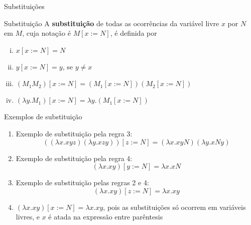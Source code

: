 \begin{frame}[fragile]{Substituições}

    \begin{block}{Substituição}
    A \textbf{substituição} de todas as ocorrências da variável livre $x$ por $N$ em $M$, cuja
    notação é $M[x:=N]$, é definida por
    \begin{enumerate}[i.]
        \item $x[x:=N] = N$
        \item $y[x:=N] = y$, se $y\neq x$
        \item $(M_1M_2)[x:=N] = (M_1[x:=N])(M_2[x:=N])$
        \item $(\lambda y.M_1)[x:=N] = \lambda y.(M_1[x:=N])$
    \end{enumerate}
    \end{block}

\end{frame}

\begin{frame}[fragile]{Exemplos de substituição}

    \begin{enumerate}
        \item Exemplo de substituição pela regra 3:
        \[
            ((\lambda x.xyz)(\lambda y.xzy))[z:=N] = (\lambda x.xyN)(\lambda y.xNy) 
        \]

        \item Exemplo de substituição pela regra 4:
        \[
            (\lambda x.xy)[y:=N] = \lambda x.xN
        \]

        \item Exemplo de substituição pelas regras 2 e 4:
        \[
            (\lambda x.xy)[z:=N] = \lambda x.xy
        \]

        \item $(\lambda x.xy)[x:=N] = \lambda x.xy$, pois as substituições só ocorrem em
            variáveis livres, e $x$ é atada na expressão entre parêntesis
    \end{enumerate}

\end{frame}

